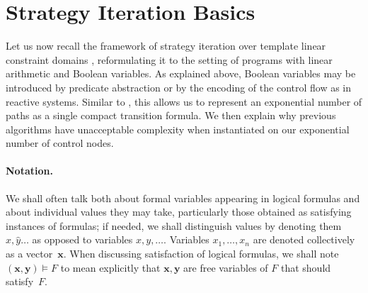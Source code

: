 \documentclass{llncs}
\newcommand{\pponly}[1]{}
\newcommand{\rronly}[1]{#1}
\newcommand{\instance}[1]{\hat{#1}}
\renewcommand{\vec}[1]{{\boldsymbol #1}}
\begin{document}
\section{Strategy Iteration Basics}
Let us now recall the framework of strategy iteration over template
linear constraint domains \cite{GS07}, reformulating it to the setting of 
programs with linear arithmetic and Boolean
variables. As explained above, Boolean variables may be introduced by 
predicate abstraction or by the encoding of the control flow as in
reactive systems. Similar to \cite{Gawlitza_Monniaux_LMCS12}, 
this allows us to represent an exponential number of paths as a
single compact transition formula.
We then explain why previous algorithms
\cite{GS07,Gawlitza_Monniaux_LMCS12} \pponly{are unacceptably
  inefficient on exponentially many control nodes}\rronly{have unacceptable complexity when instantiated
  on our exponential number of control nodes}.

\paragraph*{Notation.} 
\rronly{We shall often talk both about formal variables appearing in logical
formulas and about individual values they may take, particularly those
obtained as satisfying instances of formulas; if needed, we shall }
\pponly{We }distinguish values by denoting them $\instance{x},\instance{y}\dots$
as opposed to variables $x,y,\dots$.
Variables $x_1,\dots,x_n$ are denoted collectively as a
vector~$\vec{x}$.  \rronly{When discussing satisfaction of logical formulas,
we shall note $(\vec{x},\vec{y}) \models F$ to mean explicitly that
$\vec{x},\vec{y}$ are free variables of $F$ that should satisfy~$F$.}
\pponly{$(\vec{x},\vec{y}) \models F$ means that
$\vec{x},\vec{y}$ are free variables of formula $F$ that should satisfy~$F$.}
\end{document}
